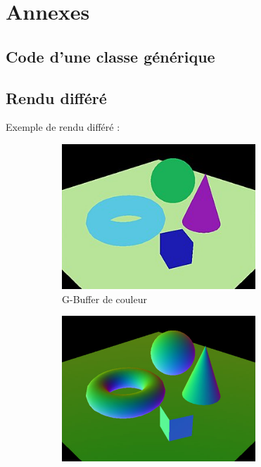 \section{Annexes}
\subsection{Code d'une classe générique}

\subsection{Rendu différé}
\label{sec:deferred_rendering}
Exemple de rendu différé :
\begin{figure}[h]
    \begin{subfigure}{0.5\textwidth}
        \centering
        \includegraphics[width=0.8\textwidth]{images/Deferred_rendering_pass_col.jpg}
        \caption{G-Buffer de couleur}
        \label{fig:drendering_pass_col}
    \end{subfigure}
    \begin{subfigure}{0.5\textwidth}
        \centering
        \includegraphics[width=0.8\textwidth]{images/Deferred_rendering_pass_nor.jpg}

\end{subfigure}
\end{figure}
